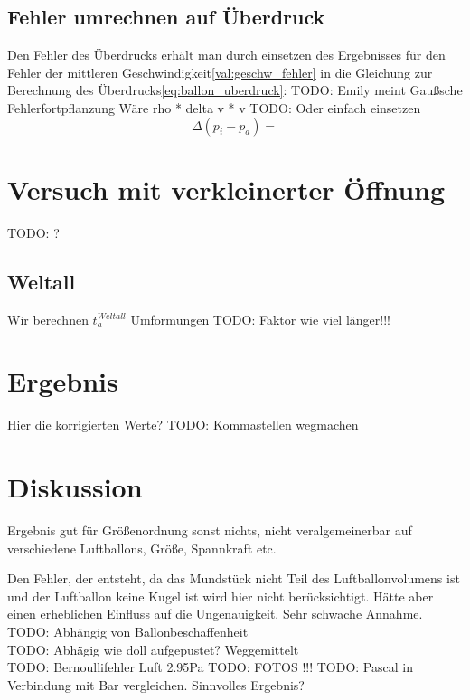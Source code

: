 \documentclass{article}
\begin{document}
        \subsection{Fehler umrechnen auf Überdruck}
            Den Fehler des Überdrucks erhält man durch einsetzen des Ergebnisses für den Fehler der mittleren Geschwindigkeit\ref{val:geschw_fehler}
            in die Gleichung zur Berechnung des Überdrucks\ref{eq:ballon_uberdruck}:
            TODO: Emily meint Gaußsche Fehlerfortpflanzung Wäre rho * delta v * v
            TODO: Oder einfach einsetzen
            \begin{equation}
                \Delta (p_i - p_a) = 
            \end{equation}
    
    \section{Versuch mit verkleinerter Öffnung}
        TODO: ?
        
    \subsection{Weltall}
        Wir berechnen \(t_a^{Weltall}\)
        Umformungen
        TODO: Faktor wie viel länger!!!
    
    
    \section{Ergebnis}
        Hier die korrigierten Werte?
        TODO: Kommastellen wegmachen \\

    \section{Diskussion}
        Ergebnis gut für Größenordnung sonst nichts, nicht veralgemeinerbar auf verschiedene Luftballons, Größe, Spannkraft etc.

        Den Fehler, der entsteht, da das Mundstück nicht Teil des Luftballonvolumens ist und der Luftballon keine Kugel ist wird hier nicht berücksichtigt.
        Hätte aber einen erheblichen Einfluss auf die Ungenauigkeit. Sehr schwache Annahme.
        TODO: Abhängig von Ballonbeschaffenheit \\
        TODO: Abhägig wie doll aufgepustet? Weggemittelt \\
        TODO: Bernoullifehler Luft 2.95Pa
        TODO: FOTOS !!!
        TODO: Pascal in Verbindung mit Bar vergleichen. Sinnvolles Ergebnis?
\end{document}
